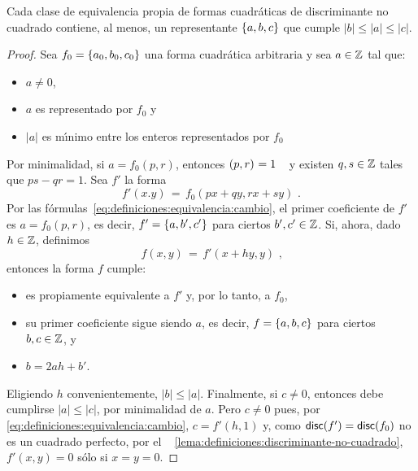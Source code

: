 \begin{lemaReducidas}\label{lema:reducidas}
	Cada clase de equivalencia propia de formas cuadr\'aticas
	de discriminante no cuadrado
	contiene, al menos, un representante $\left\{a,b,c\right\}$ que cumple
	$|b|\leq |a|\leq |c|$.
\end{lemaReducidas}

\begin{proof}
	Sea $f_0=\left\{a_0,b_0,c_0\right\}$ una forma cuadr\'atica arbitraria
	y sea $a\in\mathbb{Z}$ tal que:
	\begin{itemize}
		\item $a\neq 0$,
		\item $a$ es representado por $f_0$ y
		\item $|a|$ es m\'{\i}nimo entre los enteros representados
			por $f_0$
	\end{itemize}
	Por minimalidad, si $a=f_0(p,r)$, entonces $\left({p,r}\right)_{}=1$
	\quedacomoejercicio~
	y existen $q,s\in\mathbb{Z}$ tales que $ps-qr=1$. Sea $f'$ la forma
	\begin{displaymath}
		f'(x.y)\,=\,f_0(px+qy,rx+sy)
		\text{ .}
	\end{displaymath}
	Por las f\'ormulas~\eqref{eq:definiciones:equivalencia:cambio},
	el primer coeficiente de $f'$ es $a=f_0(p,r)$, es decir,
	$f'=\left\{a,b',c'\right\}$ para ciertos $b',c'\in\mathbb{Z}$.
	Si, ahora, dado $h\in\mathbb{Z}$, definimos
	\begin{displaymath}
		f(x,y)\,=\,f'(x+hy,y)
		\text{ ,}
	\end{displaymath}
	entonces la forma $f$ cumple:
	\begin{itemize}
		\item es propiamente equivalente a $f'$ y,
			por lo tanto, a $f_0$,
		\item su primer coeficiente sigue siendo $a$,
			es decir, $f=\left\{a,b,c\right\}$ para ciertos
			$b,c\in\mathbb{Z}$, y
		\item $b=2ah+b'$.
	\end{itemize}
	Eligiendo $h$ convenientemente, $|b|\leq |a|$. Finalmente,
	si $c\neq 0$, entonces debe cumplirse $|a|\leq |c|$, por
	minimalidad de $a$. Pero $c\neq 0$ pues, por~%
	\eqref{eq:definiciones:equivalencia:cambio}, $c=f'(h,1)$ y,
	como $\mathsf{disc}(f')=\mathsf{disc}(f_0)$ no es un cuadrado
	perfecto, por el \lemaname~%
	\ref{lema:definiciones:discriminante-no-cuadrado},
	$f'(x,y)=0$ s\'olo si $x=y=0$.
\end{proof}

